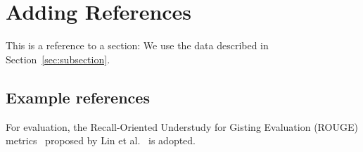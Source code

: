 \section{Adding References}\label{sec:add_ref}

This is a reference to a section: We use the data described in Section~\ref{sec:subsection}.

\subsection{Example references}
For evaluation, the Recall-Oriented Understudy for Gisting Evaluation (ROUGE) metrics~\cite{lin2004rouge} proposed by Lin et al.~\cite{lin2003automatic} is adopted.
